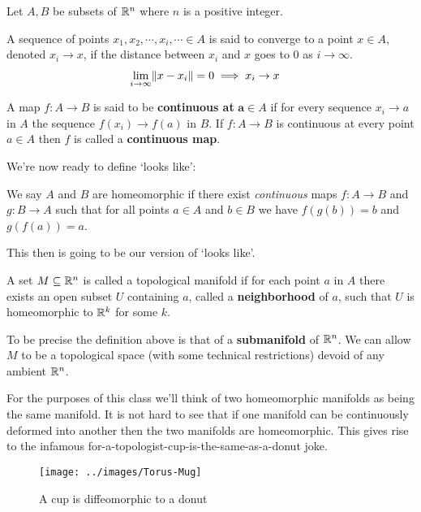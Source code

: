 	Let $A, B$ be subsets of $\mathbb{R}^n$ where $n$ is a positive integer.

	\begin{definition}
		A sequence of points $x_1, x _ 2, \cdots , x_i, \cdots \in A$ is said to converge to a point $x \in A$, denoted $x_i \rightarrow x$, if the distance between $x_i$ and $x$ goes to 0 as $i \rightarrow \infty$.
		\begin{align}
			\lim \limits _ {i \rightarrow \infty} \lVert x - x_i \rVert = 0 & \implies x_i \rightarrow x
		\end{align}
	\end{definition}

	\begin{definition}
		A map $f: A \rightarrow B$ is said to be \textbf{continuous at} $\mathbf{a} \in A$ if for every sequence $x_i \rightarrow a$ in $A$ the sequence $f(x_i) \rightarrow f(a)$ in $B$. If $f: A \rightarrow B$ is continuous at every point $a \in A$ then $f$ is called a \textbf{continuous map}.
	\end{definition}

	We're now ready to define `looks like':
	\begin{definition}
		We say $A$ and $B$ are homeomorphic if there exist \emph{continuous} maps $f: A \rightarrow B$ and $g: B \rightarrow A$ such that for all points $a\in A$ and $b \in B$ we have $f(g(b)) = b$ and $g(f(a)) = a$.
	\end{definition}
	This then is going to be our version of `looks like'.

	\begin{definition}
		A set $M \subseteq \mathbb{R}^n$ is called a topological manifold if for each point $a$ in $A$ there exists an open subset $U$ containing $a$, called a \textbf{neighborhood} of $a$, such that $U$ is homeomorphic to $\mathbb{R}^k$ for some $k$.
	\end{definition}

	To be precise the definition above is that of a \textbf{submanifold} of ${\mathbb{R}^n}$. We can allow $M$ to be a topological space (with some technical restrictions) devoid of any ambient $\mathbb{R}^n$.

	For the purposes of this class we'll think of two homeomorphic manifolds as being the same manifold. It is not hard to see that if one manifold can be continuously deformed into another then the two manifolds are homeomorphic. This gives rise to the infamous for-a-topologist-cup-is-the-same-as-a-donut joke.

	\begin{figure}[H]
		\centering
		\texttt{[image: ../images/Torus-Mug]}
		\caption{A cup is diffeomorphic to a donut}
	\end{figure}




